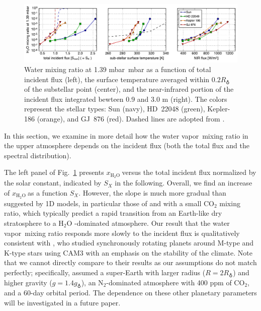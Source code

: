 \documentclass[11pt,numberedappendix,twocolappendix,]{emulateapj}
\def\water{H$_2$O }
\def\xwater{$x_\text{\water}$}
\def\preslevel{1.39 mbar\ }
\newcommand{\yf}[1]{{\color{orange}#1}}
\newcommand{\wv}{{\color{orange}water vapor\ }}
\begin{document}
\begin{figure}[!tb]
    \begin{center}
    \includegraphics[width=\hsize]{fig/xH2O_3panels.pdf}
    \end{center}
\caption{Water mixing ratio at \preslevel mbar as a function of total incident flux (left), the surface temperature \yf{averaged within $0.2R_\earth$ of the substellar point} (center), and the near-infrared portion of the incident flux integrated bewteen 0.9 and 3.0 \textmu m (right). The colors represent the stellar types: Sun (navy), HD~22048 (green), Kepler-186 (orange), and GJ~876 (red). Dashed lines are adopted from \citet{Kasting1993}. }                                                                                                             
\label{fig:xH2O_S0X}
\end{figure}

In this section, we examine in more detail how the \wv mixing ratio in the upper atmosphere depends on the incident flux (both the total flux and the spectral distribution). 

The left panel of Fig.~\ref{fig:xH2O_S0X} presents \xwater versus the total incident flux normalized by the solar constant, indicated by $S_X$ in the following. 
Overall, we find an increase of \xwater as a function $S_X$. 
However, the slope is much more gradual than suggested by 1D models, in particular those  of \citet{Kasting1993} and \citet{Wordsworth2013} with a small CO$_2$ mixing ratio, which typically predict a rapid transition from an Earth-like dry stratosphere to a \water-dominated atmosphere. 
Our result that the \wv mixing ratio responds more slowly to the incident flux is qualitatively consistent with \citet{Yang2013}, who studied synchronously rotating planets around M-type and K-type stars using CAM3 with an emphasis on the stability of the climate. 
Note that we cannot directly compare to their results as our assumptions do not match perfectly; specifically, \cite{Yang2013} assumed a super-Earth with larger radius ($R=2R_\earth$) and higher gravity ($g=1.4g_\earth$), an N$_2$-dominated atmosphere with 400 ppm of CO$_2$, and a 60-day orbital period. 
The dependence on these other planetary parameters will be investigated in a future paper. 
\end{document}
